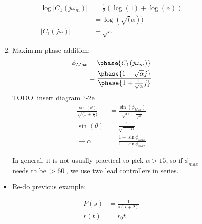 \begin{enumerate}
\begin{enumerate}
\begin{enumerate}
\begin{enumerate}
                                \begin{align*}
                                    \log\left| C_1(j \omega_m) \right| &= \frac{1}{2} \left( \log(1) + \log(\alpha)\right) \\
                                    &= \log(\sqrt(\alpha)) \\
                                    |C_1(j \omega)| &= \sqrt{\alpha}
                                \end{align*}
                            \item Maximum phase addition:
                                \begin{align*}
                                    \phi_{Max} &= \phase{C_1(j \omega_m)} \\
                                    &= \frac{\phase{1 + \sqrt{\alpha} j}}{\phase{1 + \frac{1}{\sqrt{\alpha}} j}} \\
                                \end{align*}
                                TODO: insert diagram 7-2e
                                \begin{align*}
                                    \frac{\sin(\theta)}{\sqrt(1 + \frac{1}{\alpha})} &= \frac{\sin(\phi_{Max})}{\sqrt{\alpha} - \frac{1}{\sqrt{\alpha}}} \\
                                    \sin(\theta) &= \frac{1}{\sqrt{1 + \alpha}} \\
                                    \rightarrow \alpha &= \frac{1 + \sin \phi_{max}}{1 - \sin \phi_{max}}
                                \end{align*}

                                In general, it is not usually practical to pick $\alpha > 15$, so if $\phi_{max} $ needs to be $ > 60$ \textdegree, we use two lead controllers in series.
                        \end{enumerate}
                        \begin{itemize}
                            \item Re-do previous example:

                                \begin{align*}
                                    P(s) &= \frac{1}{s(s+2)} \\
                                    r(t) &= r_0t
                                \end{align*}


\end{itemize}
\end{enumerate}
\end{enumerate}
\end{enumerate}
